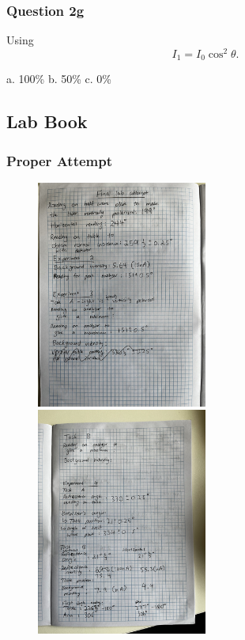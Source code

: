 \documentclass{article}
\begin{document}
\subsubsection{Question 2g}
Using
\begin{equation}
    I_1 = I_0 \cos^2{\theta}.
\end{equation}

a. 100\%
b. 50\%
c. 0\%
\subsection{Lab Book}
\subsubsection{Proper Attempt}

\begin{figure}[H]
    \centering
    \includegraphics[width=0.5\textwidth,angle=270,origin=c]{labbook10.jpg}
    \hspace{0.5cm}
    \includegraphics[width=0.5\textwidth,angle=270,origin=c]{labbook11.jpg}

\end{figure}
\end{document}
